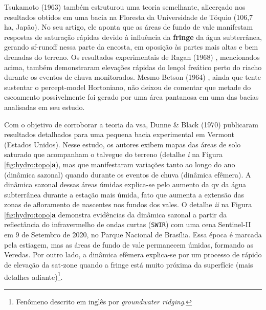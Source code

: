 \documentclass[./main.tex]{subfiles}
\begin{document}
\noindent Tsukamoto (1963) \cite{Tsukamoto1963} também estruturou uma \gls{teoria} semelhante, alicerçado nos resultados obtidos em uma bacia na Floresta da Universidade de Tóquio (106,7 ha, Japão). No seu artigo, ele aponta que as áreas de fundo de vale manifestam respostas de saturação rápidas devido à influência da \textbf{\gls{fringe}} da água subterrânea, gerando \gls{sf-runoff} nessa parte da encosta, em oposição às partes mais altas e bem drenadas do terreno. Os resultados experimentais de Ragan (1968) \cite{Ragan1968}, mencionados acima, também demonstraram elevações rápidas do lençol freático perto do riacho durante os eventos de chuva monitorados. Mesmo Betson (1964) \cite{Betson1964}, ainda que tente sustentar o \gls{percept-model} Hortoniano, não deixou de comentar que metade do escoamento possivelmente foi gerado por uma área pantanosa em uma das bacias analisadas em seu estudo.

\par Com o objetivo de corroborar a \gls{teoria} da \gls{vsa}, Dunne \& Black (1970) \cite{Dunne1970} publicaram resultados detalhados para uma pequena bacia experimental em Vermont (Estados Unidos). Nesse estudo, os autores exibem mapas das áreas de solo saturado que acompanham o talvegue do terreno (detalhe \textit{i} na Figura \ref{fig:hydro:topo}\textbf{a}), mas que manifestaram variações tanto ao longo do ano (dinâmica sazonal) quando durante os eventos de chuva (dinâmica efêmera). A dinâmica sazonal dessas áreas úmidas explica-se pelo aumento da \gls{qv} da água subterrânea durante a estação mais úmida, fato que aumenta a extensão das zonas de afloramento de nascentes nos fundos dos vales. O detalhe \textit{ii} na Figura \ref{fig:hydro:topo}\textbf{a} demonstra evidências da dinâmica sazonal a partir da reflectância do infravermelho de ondas curtas (\texttt{SWIR}) com uma cena Sentinel-II em 9 de Setembro de 2020, no Parque Nacional de Brasília. Essa época é marcada pela estiagem, mas as áreas de fundo de vale permanecem úmidas, formando as Veredas. Por outro lado, a dinâmica efêmera explica-se por um processo de rápido de elevação da \gls{sat-zone} quando a \gls{fringe} está muito próxima da superfície (mais detalhes adiante)\footnote{Fenômeno descrito em inglês por \textit{groundwater ridging}.}. 
\end{document}
